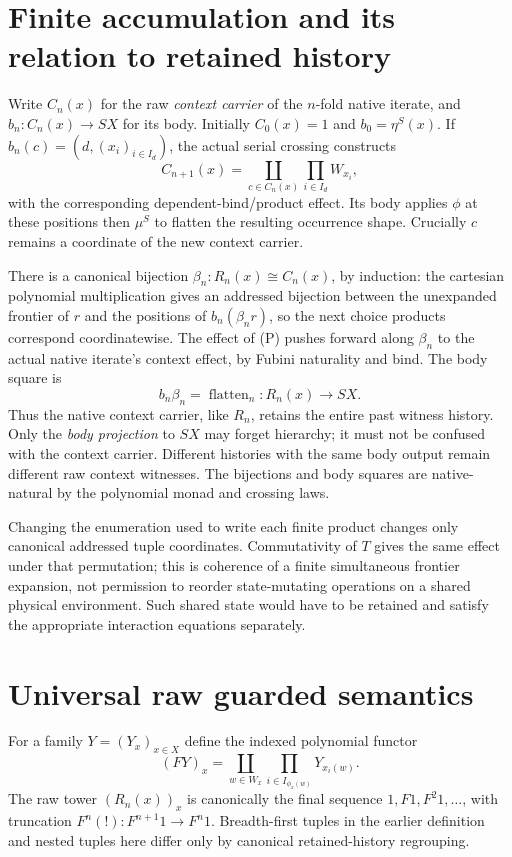 \documentclass[11pt]{article}
\begin{document}
\section{Finite accumulation and its relation to retained history}
Write $C_n(x)$ for the raw \emph{context carrier} of the $n$-fold native iterate, and $b_n:C_n(x)\to SX$ for its body. Initially $C_0(x)=1$ and $b_0=\eta^S(x)$. If $b_n(c)=(d,(x_i)_{i\in I_d})$, the actual serial crossing constructs
\[
 C_{n+1}(x)=\coprod_{c\in C_n(x)}\prod_{i\in I_d}W_{x_i},
\]
with the corresponding dependent-bind/product effect. Its body applies $\phi$ at these positions then $\mu^S$ to flatten the resulting occurrence shape. Crucially $c$ remains a coordinate of the new context carrier.

There is a canonical bijection $\beta_n:R_n(x)\cong C_n(x)$, by induction: the cartesian polynomial multiplication gives an addressed bijection between the unexpanded frontier of $r$ and the positions of $b_n(\beta_n r)$, so the next choice products correspond coordinatewise. The effect of (P) pushes forward along $\beta_n$ to the actual native iterate's context effect, by Fubini naturality and bind. The body square is
\[
 b_n\beta_n=\operatorname{flatten}_n:R_n(x)\longrightarrow SX.
\]
Thus the native context carrier, like $R_n$, retains the entire past witness history. Only the \emph{body projection} to $SX$ may forget hierarchy; it must not be confused with the context carrier. Different histories with the same body output remain different raw context witnesses. The bijections and body squares are native-natural by the polynomial monad and crossing laws.

Changing the enumeration used to write each finite product changes only canonical addressed tuple coordinates. Commutativity of $T$ gives the same effect under that permutation; this is coherence of a finite simultaneous frontier expansion, not permission to reorder state-mutating operations on a shared physical environment. Such shared state would have to be retained and satisfy the appropriate interaction equations separately.

\section{Universal raw guarded semantics}
For a family $Y=(Y_x)_{x\in X}$ define the indexed polynomial functor
\[
 (F Y)_x=\coprod_{w\in W_x}\prod_{i\in I_{\phi_x(w)}}Y_{x_i(w)}.
\]
The raw tower $(R_n(x))_x$ is canonically the final sequence $1,F1,F^2 1,\ldots$, with truncation $F^n(!):F^{n+1}1\to F^n1$. Breadth-first tuples in the earlier definition and nested tuples here differ only by canonical retained-history regrouping.
\end{document}

